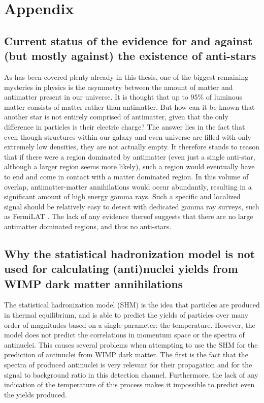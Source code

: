 \section{Appendix}
\subsection{Current status of the evidence for and against (but mostly against) the existence of anti-stars}
As has been covered plenty already in this thesis, one of the biggest remaining mysteries in physics is the asymmetry between the amount of matter and antimatter present in our universe. It is thought that up to 95\% of luminous matter consists of matter rather than antimatter\cite{}. But how can it be known that another star is not entirely comprised of antimatter, given that the only difference in particles is their electric charge? The answer lies in the fact that even though structures within our galaxy and even universe are filled with only extremely low densities, they are not actually empty. It therefore stands to reason that if there were a region dominated by antimatter (even just a single anti-star, although a larger region seems more likely), such a region would eventually have to end and come in contact with a matter dominated region. In this volume of overlap, antimatter-matter annihilations would occur abundantly, resulting in a significant amount of high energy gamma rays. Such a specific and localized signal should be relatively easy to detect with dedicated gamma ray surveys, such as FermiLAT \cite{FermiLAT_Point_Sources}. The lack of any evidence thereof suggests that there are no large antimatter dominated regions, and thus no anti-stars. 
\subsection{Why the statistical hadronization model is not used for calculating (anti)nuclei yields from WIMP dark matter annihilations}\label{App:statHadronModel}
The statistical hadronization model (SHM) \cite{statHadronModel_review_2009} is the idea that particles are produced in thermal equilibrium, and is able to predict the yields of particles over many order of magnitudes based on a single parameter: the temperature. However, the model does not predict the correlations in momentum space or the spectra of antinuclei. This causes several problems when attempting to use the SHM for the prediction of antinuclei from WIMP dark matter. The first is the fact that the spectra of produced antinuclei is very relevant for their propagation and for the signal to background ratio in this detection channel. Furthermore, the lack of any indication of the temperature of this process makes it impossible to predict even the yields produced. 
